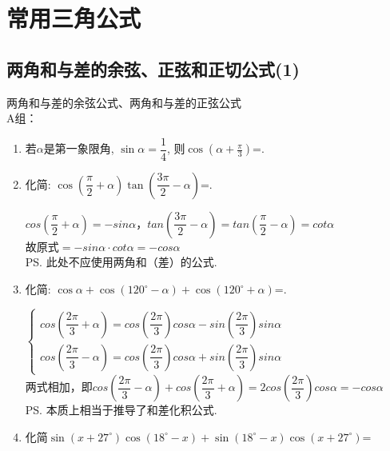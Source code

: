 \section{常用三角公式}

\subsection{两角和与差的余弦、正弦和正切公式(1)}
\zsd 两角和与差的余弦公式、两角和与差的正弦公式 \\
A组：
\begin{enumerate}
\item 若$\alpha$是第一象限角, $\sin\alpha=\dfrac{1}{4}$, 则$\cos\left(\alpha+\frac{\pi}{3}\right)$=. 
\item 化简: $\cos\left(\dfrac{\pi}{2}+\alpha\right)\tan\left(\dfrac{3\pi}{2}-\alpha\right)$=\blkda{$-\cos\alpha$}. 
\begin{jieda}
    $cos\left(\dfrac{\pi}{2}+\alpha\right) = -sin\alpha$，$tan\left(\dfrac{3\pi}{2}-\alpha\right) = tan\left(\dfrac{\pi}{2}-\alpha\right) = cot\alpha$ \\
    故原式$= -sin\alpha \cdot cot\alpha = -cos\alpha$ \\
    \ps 此处不应使用两角和（差）的公式.
\end{jieda}
\item 化简: $\cos\alpha+\cos\left(120^{\circ}-\alpha\right)+\cos\left(120^{\circ}+\alpha\right)$=.
\begin{jieda}
    $\left \{\begin{array}{l}
        cos\left(\dfrac{2\pi}{3}+\alpha\right) = cos\left(\dfrac{2\pi}{3}\right)cos\alpha - sin\left(\dfrac{2\pi}{3}\right)sin\alpha \\
        cos\left(\dfrac{2\pi}{3}-\alpha\right) = cos\left(\dfrac{2\pi}{3}\right)cos\alpha + sin\left(\dfrac{2\pi}{3}\right)sin\alpha
    \end{array} \right. $ \\
    两式相加，即$cos\left(\dfrac{2\pi}{3}-\alpha\right)+cos\left(\dfrac{2\pi}{3}+\alpha\right) = 2cos\left(\dfrac{2\pi}{3}\right)cos\alpha = -cos\alpha$ \\
    \ps 本质上相当于推导了和差化积公式.
\end{jieda}
\item 化简$\sin\left(x+27^\circ\right)\cos\left(18^\circ-x\right)+\sin\left(18^\circ-x\right)\cos\left(x+27^\circ\right)$=


\end{enumerate}
